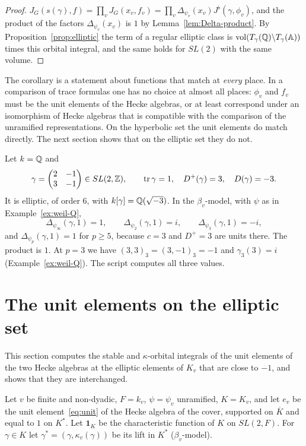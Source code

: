 \begin{proof}
$J_G(s(\gamma),f)=\prod_vJ_G(x_v,f_v)=\prod_v\Delta_{\psi_v}(x_v)J^\flat(\gamma,
\phi_v)$, and the product of the factors $\Delta_{\psi_v}(x_v)$ is $1$ by
Lemma~\ref{lem:Delta-product}. By Proposition~\ref{prop:elliptic} the
term of a regular elliptic class is $\operatorname{vol}(T_\gamma(\mathbb{Q})\backslash
T_\gamma(\mathbb{A}))$ times this orbital integral, and the same holds for
$SL(2)$ with the same volume.
\end{proof}

The corollary is a statement about functions that match at \emph{every}
place. In a comparison of trace formulas one has no choice at almost all
places: $\phi_v$ and $f_v$ must be the unit elements of the Hecke
algebras, or at least correspond under an isomorphism of Hecke algebras
that is compatible with the comparison of the unramified
representations. On the hyperbolic set the unit elements do match
directly. The next section shows that on the elliptic set they do not.

\begin{example}\label{ex:coherent}
Let $k=\mathbb{Q}$ and
\[
\gamma=\begin{pmatrix}2&-1\\3&-1\end{pmatrix}\in SL(2,\mathbb{Z}),\qquad
\operatorname{tr}\gamma=1,\quad D^+(\gamma)=3,\quad D(\gamma)=-3 .
\]
It is elliptic, of order $6$, with $k[\gamma]=\mathbb{Q}(\sqrt{-3})$. In the
$\beta_v$-model, with $\psi$ as in Example~\ref{ex:weil-Q},
\[
\Delta_{\psi_\infty}(\gamma,1)=1,\qquad\Delta_{\psi_2}(\gamma,1)=i,\qquad
\Delta_{\psi_3}(\gamma,1)=-i,
\]
and $\Delta_{\psi_p}(\gamma,1)=1$ for $p\ge5$, because $c=3$ and $D^+=3$
are units there. The product is $1$. At $p=3$ we have $(3,3)_3=(3,-1)_3=-1$
and $\gamma_3(3)=i$ (Example~\ref{ex:weil-Q}). The script computes all
three values.
\end{example}

\section{The unit elements on the elliptic set}\label{sec:unit-elliptic}

This section computes the stable and $\kappa$-orbital integrals of the
unit elements of the two Hecke algebras at the elliptic elements of
$K_v$ that are close to $-1$, and shows that they are interchanged.

Let $v$ be finite and non-dyadic, $F=k_v$, $\psi=\psi_v$ unramified,
$K=K_v$, and let $e_v$ be the unit element~\eqref{eq:unit} of the Hecke
algebra of the cover, supported on $\overline K$ and equal to $1$ on
$K^*$. Let $\mathbf 1_K$ be the characteristic function of $K$ on
$SL(2,F)$. For $\gamma\in K$ let $\gamma^*=(\gamma,\kappa_v(\gamma))$ be
its lift in $K^*$ ($\beta_v$-model).

